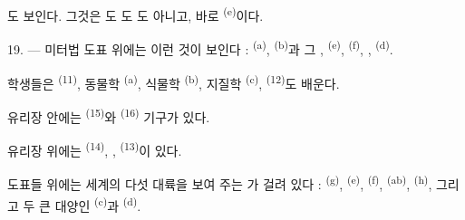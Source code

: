 도 보인다. 그것은 도 도 도
아니고, 바로  \textsuperscript{(e)}이다.

19. --- 미터법 도표 위에는 이런 것이 보인다 :  \textsuperscript{(a)},
 \textsuperscript{(b)}과 그 , 
\textsuperscript{(e)},  \textsuperscript{(f)}, ,
 \textsuperscript{(d)}.

학생들은  \textsuperscript{(11)}, 동물학 \textsuperscript{(a)},
식물학 \textsuperscript{(b)}, 지질학 \textsuperscript{(c)}, 
\textsuperscript{(12)}도 배운다.

유리장 안에는  \textsuperscript{(15)}와 
\textsuperscript{(16)} 기구가 있다.

유리장 위에는  \textsuperscript{(14)}, , 
\textsuperscript{(13)}이 있다.

도표들 위에는 세계의 다섯 대륙을 보여 주는 가 걸려 있다 :
 \textsuperscript{(g)},  \textsuperscript{(e)},
 \textsuperscript{(f)},  \textsuperscript{(ab)},
 \textsuperscript{(h)}, 그리고 두 큰 대양인 
\textsuperscript{(c)}과  \textsuperscript{(d)}.

\VUsaut{6.0mm}
\VUfilet{22mm}
